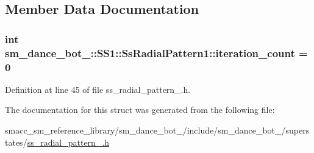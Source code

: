 \subsection{Member Data Documentation}
\subsubsection[{\texorpdfstring{iteration\+\_\+count}{iteration_count}}]{\setlength{\rightskip}{0pt plus 5cm}int sm\+\_\+dance\+\_\+bot\+\_\+::\+S\+S1\+::\+Ss\+Radial\+Pattern1\+::iteration\+\_\+count = 0}\hypertarget{structsm__dance__bot__3_1_1SS1_1_1SsRadialPattern1_a65f1fba9b7a18750484142c533514a70}{}\label{structsm__dance__bot__3_1_1SS1_1_1SsRadialPattern1_a65f1fba9b7a18750484142c533514a70}


Definition at line 45 of file ss\+\_\+radial\+\_\+pattern\+\_.\+h.



The documentation for this struct was generated from the following file\+:\begin{DoxyCompactItemize}
\item 
smacc\+\_\+sm\+\_\+reference\+\_\+library/sm\+\_\+dance\+\_\+bot\+\_/include/sm\+\_\+dance\+\_\+bot\+\_/superstates/\hyperlink{3_2include_2sm__dance__bot__3_2superstates_2ss__radial__pattern__1_8h}{ss\+\_\+radial\+\_\+pattern\+\_.\+h}\end{DoxyCompactItemize}
